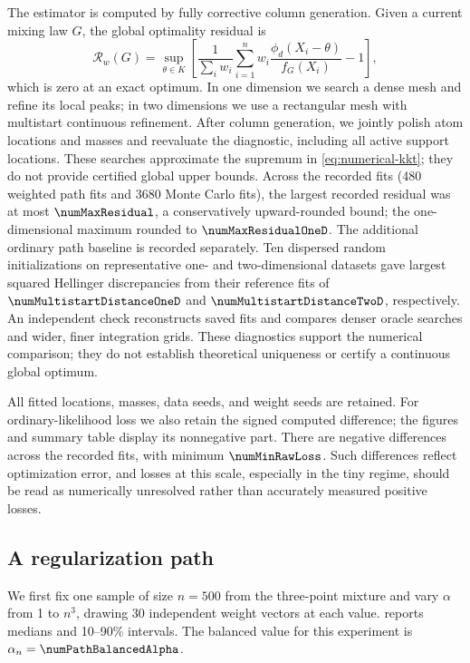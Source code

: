 \documentclass[11pt]{article}
\theoremstyle{definition}
\theoremstyle{remark}
\begin{document}
The estimator is computed by fully corrective column generation.  Given a
current mixing law $G$, the global optimality residual is
\begin{equation}\label{eq:numerical-kkt}
 \mathcal R_w(G)=
 \sup_{\theta\in K}\left[
 \frac{1}{\sum_iw_i}\sum_{i=1}^n
 w_i\frac{\phi_d(X_i-\theta)}{f_G(X_i)}-1
 \right],
\end{equation}
which is zero at an exact optimum.  In one dimension we search a dense mesh
and refine its local peaks; in two dimensions we use a rectangular mesh with
multistart continuous refinement.  After column generation, we jointly
polish atom locations and masses and reevaluate the diagnostic, including
all active support locations.  These searches approximate the supremum in
\eqref{eq:numerical-kkt}; they do not provide certified global upper bounds.
Across the \numReportedFits{} recorded fits (480 weighted path fits and
3680 Monte Carlo fits), the largest recorded residual was at most
$\numMaxResidual$, a conservatively upward-rounded bound; the
one-dimensional maximum rounded to $\numMaxResidualOneD$.  The additional
ordinary path baseline is recorded separately.  Ten dispersed random
initializations on representative one- and two-dimensional datasets gave
largest squared Hellinger discrepancies from their reference fits of
$\numMultistartDistanceOneD$ and $\numMultistartDistanceTwoD$, respectively.
An independent check reconstructs saved fits and compares denser oracle
searches and wider, finer integration grids.  These diagnostics support the
numerical comparison; they do not establish theoretical uniqueness or
certify a continuous global optimum.

All fitted locations, masses, data seeds, and weight seeds are retained.
For ordinary-likelihood loss we also retain the signed computed difference;
the figures and summary table display its nonnegative part.  There are
\numNegativeRawLossCount{} negative differences across the recorded fits,
with minimum $\numMinRawLoss$.  Such differences reflect optimization error,
and losses at this scale, especially in the tiny regime, should be read as
numerically unresolved rather than accurately measured positive losses.

\subsection{A regularization path}

We first fix one sample of size $n=500$ from the three-point mixture and vary
$\alpha$ from 1 to $n^3$, drawing 30 independent weight vectors at each
value.   reports medians and 10--90\% intervals.  The balanced
value for this experiment is $\alpha_n=\numPathBalancedAlpha$.
\end{document}
